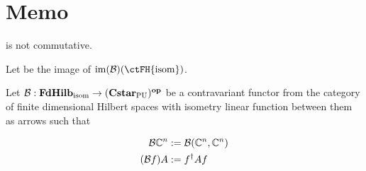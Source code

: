 \section{Memo}
\begin{Claim}
 is not commutative.
\end{Claim}

Let  be the image of $\rm{im}(\mathcal{B})(\ctFH{isom})$.

Let $\mathcal{B}: \bf{FdHilb}_\text{isom} \to (\bf{Cstar}_\text{PU})^{op} $ be a contravariant functor from the category of finite dimensional Hilbert spaces with isometry linear function between them as arrows such that

\begin{align*} 
\mathcal{B}\Bbb{C}^n &:= \mathcal{B}(\Bbb{C}^n, \Bbb{C}^n)\\
(\mathcal{B} f)A &:= f^\dagger Af
\end{align*}

 